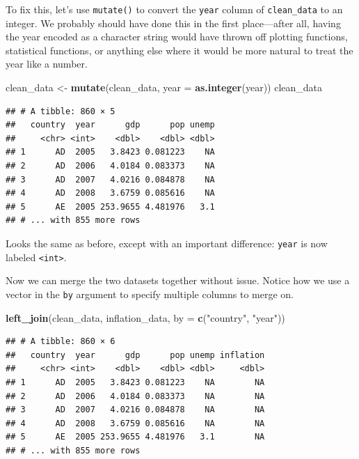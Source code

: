 \documentclass[12pt,oneside,openany]{book}
\newenvironment{Shaded}{\begin{snugshade}}{\end{snugshade}}
\newcommand{\KeywordTok}[1]{\textcolor[rgb]{0.13,0.29,0.53}{\textbf{{#1}}}}
\newcommand{\DataTypeTok}[1]{\textcolor[rgb]{0.13,0.29,0.53}{{#1}}}
\newcommand{\StringTok}[1]{\textcolor[rgb]{0.31,0.60,0.02}{{#1}}}
\newcommand{\NormalTok}[1]{{#1}}
\begin{document}
To fix this, let's use \texttt{mutate()} to convert the \texttt{year}
column of \texttt{clean\_data} to an integer. We probably should have
done this in the first place---after all, having the year encoded as a
character string would have thrown off plotting functions, statistical
functions, or anything else where it would be more natural to treat the
year like a number.

\begin{Shaded}
\begin{Highlighting}[]
\NormalTok{clean_data <-}\StringTok{ }\KeywordTok{mutate}\NormalTok{(clean_data,}
                     \DataTypeTok{year =} \KeywordTok{as.integer}\NormalTok{(year))}
\NormalTok{clean_data}
\end{Highlighting}
\end{Shaded}

\begin{verbatim}
## # A tibble: 860 × 5
##   country  year      gdp      pop unemp
##     <chr> <int>    <dbl>    <dbl> <dbl>
## 1      AD  2005   3.8423 0.081223    NA
## 2      AD  2006   4.0184 0.083373    NA
## 3      AD  2007   4.0216 0.084878    NA
## 4      AD  2008   3.6759 0.085616    NA
## 5      AE  2005 253.9655 4.481976   3.1
## # ... with 855 more rows
\end{verbatim}

Looks the same as before, except with an important difference:
\texttt{year} is now labeled \texttt{\textless{}int\textgreater{}}.

Now we can merge the two datasets together without issue. Notice how we
use a vector in the \texttt{by} argument to specify multiple columns to
merge on.

\begin{Shaded}
\begin{Highlighting}[]
\KeywordTok{left_join}\NormalTok{(clean_data,}
          \NormalTok{inflation_data,}
          \DataTypeTok{by =} \KeywordTok{c}\NormalTok{(}\StringTok{"country"}\NormalTok{, }\StringTok{"year"}\NormalTok{))}
\end{Highlighting}
\end{Shaded}

\begin{verbatim}
## # A tibble: 860 × 6
##   country  year      gdp      pop unemp inflation
##     <chr> <int>    <dbl>    <dbl> <dbl>     <dbl>
## 1      AD  2005   3.8423 0.081223    NA        NA
## 2      AD  2006   4.0184 0.083373    NA        NA
## 3      AD  2007   4.0216 0.084878    NA        NA
## 4      AD  2008   3.6759 0.085616    NA        NA
## 5      AE  2005 253.9655 4.481976   3.1        NA
## # ... with 855 more rows
\end{verbatim}
\end{document}
